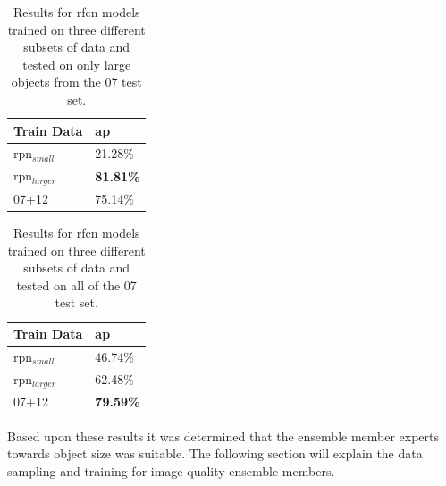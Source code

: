 \begin{table}[h]
\centering
\caption{Results for \gls{rfcn} models trained on three different subsets of data and tested on only large objects from the 07 test set.}
\label{tab:large07res}
\begin{tabular}{|l|l|}
\hline
\textbf{Train Data} & \textbf{\gls{ap}}      \\ \hline
\gls{rpn}$_{small}$      & 21.28\% \\ \hline
\gls{rpn}$_{larger}$      & \textbf{81.81\%} \\ \hline
07+12        & 75.14\% \\ \hline
\end{tabular}
\end{table}


\begin{table}[h]
\centering
\caption{Results for \gls{rfcn} models trained on three different subsets of data and tested on all of the 07 test set.}
\label{tab:alldatares}
\begin{tabular}{|l|l|}
\hline
\textbf{Train Data} & \textbf{\gls{ap}}      \\ \hline
\gls{rpn}$_{small}$      & 46.74\% \\ \hline
\gls{rpn}$_{larger}$      & 62.48\% \\ \hline
07+12        & \textbf{79.59\%} \\ \hline
\end{tabular}
\end{table}

Based upon these results it was determined that the ensemble member experts towards object size was suitable. The following section will explain the data sampling and training for image quality ensemble members.

